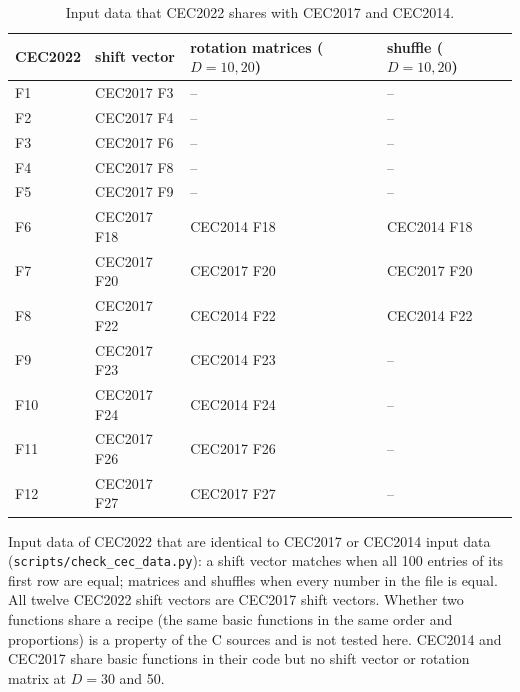 \begin{table}[htbp]
\centering
\caption{Input data that CEC2022 shares with CEC2017 and CEC2014.}
\label{tab:supp_lineage}
\begin{tabular}{llll}
\toprule
CEC2022 & shift vector & rotation matrices ($D=10,20$) & shuffle ($D=10,20$) \\
\midrule
F1 & CEC2017 F3 & -- & -- \\
F2 & CEC2017 F4 & -- & -- \\
F3 & CEC2017 F6 & -- & -- \\
F4 & CEC2017 F8 & -- & -- \\
F5 & CEC2017 F9 & -- & -- \\
F6 & CEC2017 F18 & CEC2014 F18 & CEC2014 F18 \\
F7 & CEC2017 F20 & CEC2017 F20 & CEC2017 F20 \\
F8 & CEC2017 F22 & CEC2014 F22 & CEC2014 F22 \\
F9 & CEC2017 F23 & CEC2014 F23 & -- \\
F10 & CEC2017 F24 & CEC2014 F24 & -- \\
F11 & CEC2017 F26 & CEC2017 F26 & -- \\
F12 & CEC2017 F27 & CEC2017 F27 & -- \\
\bottomrule
\end{tabular}
\begin{flushleft}\footnotesize
Input data of CEC2022 that are identical to CEC2017 or CEC2014 input data (\texttt{scripts/check\_cec\_data.py}): a shift vector matches when all 100 entries of its first row are equal; matrices and shuffles when every number in the file is equal. All twelve CEC2022 shift vectors are CEC2017 shift vectors. Whether two functions share a recipe (the same basic functions in the same order and proportions) is a property of the C sources and is not tested here. CEC2014 and CEC2017 share basic functions in their code but no shift vector or rotation matrix at $D=30$ and 50.
\end{flushleft}
\end{table}
